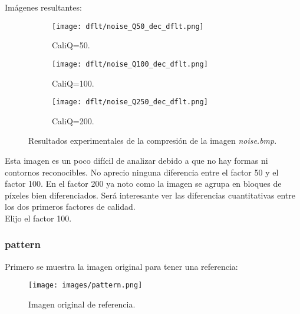 \documentclass[12pt,a4paper]{article}
\begin{document}
Imágenes resultantes:
\begin{figure}   [H]
    \begin{subfigure}{0.30\textwidth}
        \centering
        \texttt{[image: dflt/noise\_Q50\_dec\_dflt.png]}
        \caption{CaliQ=50.}
        
    \end{subfigure}
    \hfill
    \begin{subfigure}{0.30\textwidth}
        \centering
        \texttt{[image: dflt/noise\_Q100\_dec\_dflt.png]}
        \caption{CaliQ=100.}
        
    \end{subfigure}
    \hfill
    \begin{subfigure}{0.30\textwidth}
        \centering
        \texttt{[image: dflt/noise\_Q250\_dec\_dflt.png]}
        \caption{CaliQ=200.}
        
    \end{subfigure}
    
    \caption[Resultados experimentales - noise]{Resultados experimentales de la compresión de la imagen \textit{noise.bmp}.}
    
\end{figure}

Esta imagen es un poco difícil de analizar debido a que no hay formas ni contornos reconocibles. No aprecio ninguna diferencia entre el factor 50 y el factor 100. En el factor 200 ya noto como la imagen se agrupa en bloques de píxeles bien diferenciados. Será interesante ver las diferencias cuantitativas entre los dos primeros factores de calidad.\\

Elijo el factor 100.


\subsubsection{pattern}
Primero se muestra la imagen original para tener una referencia:
\begin{figure}[H]
    \centering
    \texttt{[image: images/pattern.png]}
    \caption[Referencia - pattern]{Imagen original de referencia.}
    
\end{figure}
    \vspace{0.5cm}
\end{document}
